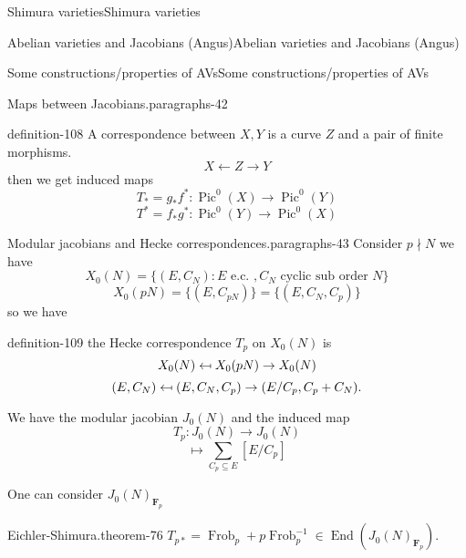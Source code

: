 \documentclass[10pt,]{book}
\numberwithin{equation}{section}
\newcommand{\inv}{^{-1}}
\providecommand\mapsfrom{\mathrel{\reflectbox{\ensuremath{\mapsto}}}}
\newcommand{\FF}{\mathbf{F}}
\DeclareMathOperator{\End}{End}
\DeclareMathOperator{\Pic}{Pic}
\DeclareMathOperator{\Frob}{Frob}
\begin{document}
\begin{chapterptx}{Shimura varieties}{}{Shimura varieties}{}{}
\begin{sectionptx}{Abelian varieties and Jacobians (Angus)}{}{Abelian varieties and Jacobians (Angus)}{}{}
\begin{subsectionptx}{Some constructions/properties of AVs}{}{Some constructions/properties of AVs}{}{}
\begin{paragraphs}{Maps between Jacobians.}{paragraphs-42}
\begin{definition}{}{definition-108}%
\hypertarget{p-1118}{}%
A correspondence between \(X,Y\) is a curve \(Z\) and a pair of finite morphisms.%
\begin{equation*}
X \leftarrow Z \to Y
\end{equation*}
then we get induced maps%
\begin{equation*}
T_* = g_* f^* \colon \Pic^0(X) \to \Pic^0(Y)
\end{equation*}
%
\begin{equation*}
T^* = f_* g^* \colon \Pic^0(Y) \to \Pic^0(X)
\end{equation*}
%
\end{definition}
\end{paragraphs}%
\begin{paragraphs}{Modular jacobians and Hecke correspondences.}{paragraphs-43}%
\hypertarget{p-1119}{}%
Consider \(p\nmid N\) we have%
\begin{equation*}
X_0(N) = \{ (E,C_N) : E\text{ e.c. }, C_N \text{ cyclic sub order } N\}
\end{equation*}
%
\begin{equation*}
X_0(pN) = \{(E,C_{pN})\} = \{(E,C_N,C_p)\}
\end{equation*}
so we have%
\begin{definition}{}{definition-109}%
\hypertarget{p-1120}{}%
the Hecke correspondence \(T_p\) on \(X_0(N)\) is%
\begin{equation*}
X_0(N) \mapsfrom X_0(pN) \to X_0(N)
\end{equation*}
%
\begin{equation*}
(E,C_N)\mapsfrom (E,C_N,C_p)\to (E/C_p, C_p + C_N)\text{.}
\end{equation*}
%
\end{definition}
\hypertarget{p-1121}{}%
We have the modular jacobian \(J_0(N)\) and the induced map%
\begin{equation*}
T_p \colon J_0(N) \to J_0(N)
\end{equation*}
%
\begin{equation*}
[E] \mapsto \sum_{C_p \subseteq E} [E/C_p]
\end{equation*}
%
\par
\hypertarget{p-1122}{}%
One can consider \(J_0(N)_{\FF_p}\)%
\begin{theorem}{Eichler-Shimura.}{}{theorem-76}%
\hypertarget{p-1123}{}%
\(T_{p*} = \Frob_p + p \Frob_p\inv \in \End(J_0(N)_{\FF_p})\).%
\end{theorem}
\end{paragraphs}%

\end{subsectionptx}
\end{sectionptx}
\end{chapterptx}
\end{document}
